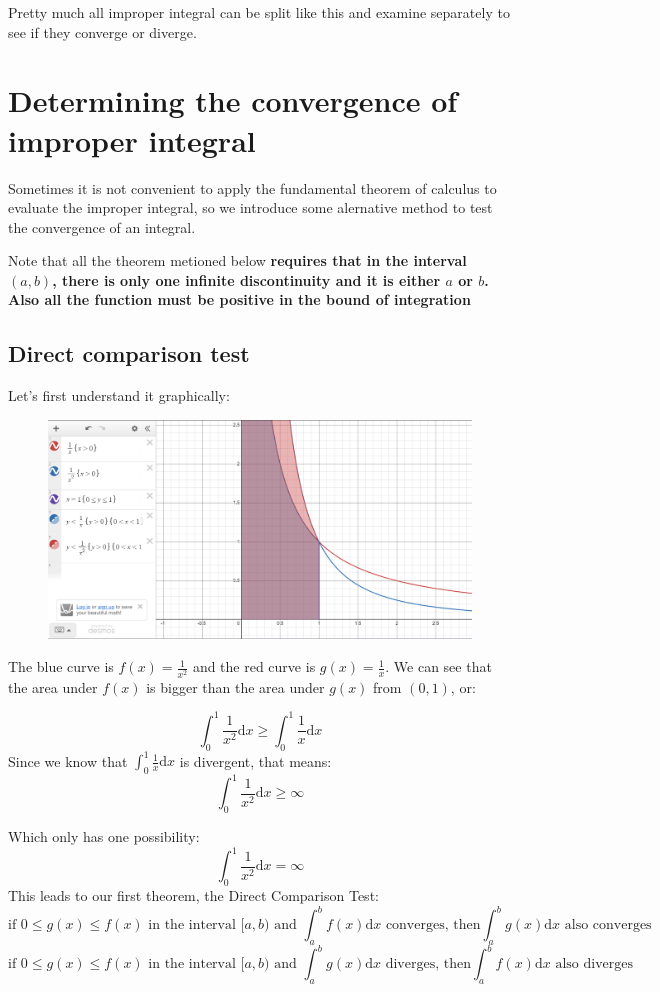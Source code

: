 \documentclass{article}
\begin{document}
Pretty much all improper integral can be split like this and examine separately to see if they converge or diverge.

\newpage
\section{Determining the convergence of improper integral}
Sometimes it is not convenient to apply the fundamental theorem of calculus to evaluate the improper integral, so we introduce some alernative method to test the convergence of an integral.

Note that all the theorem metioned below \textbf{requires that in the interval $(a,b)$, there is only one infinite discontinuity and it is either $a$ or $b$. Also all the function must be positive in the bound of integration}
\subsection{Direct comparison test}
Let's first understand it graphically:
\begin{figure}[H]
    \includegraphics[width = 12cm]{pictures/improperintegral2}
    \centering
\end{figure}
The blue curve is $f(x) = \frac{1}{x^2}$ and the red curve is $g(x) = \frac{1}{x}$. We can see that the area under $f(x)$ is bigger than the area under $g(x)$ from $(0,1)$, or:

\[
    \int_{0}^{1}\frac{1}{x^2}\mathrm{d}x \geq \int_{0}^{1}\frac{1}{x}\mathrm{d}x
\]
Since we know that $\int_{0}^{1}\frac{1}{x}\mathrm{d}x$ is divergent, that means:
\[
    \int_{0}^{1}\frac{1}{x^2}\mathrm{d}x \geq \infty
\]

Which only has one possibility:
\[
    \int_{0}^{1}\frac{1}{x^2}\mathrm{d}x = \infty
\]
This leads to our first theorem, the Direct Comparison Test:
\[
    \text{if } 0 \leq g(x) \leq f(x) \text{ in the interval } [a,b) \text{ and } \int_{a}^{b} f(x) \mathrm{d}x \text{ converges, then} \int_{a}^{b} g(x) \mathrm{d}x \text{ also converges}
\]
\[
    \text{if } 0 \leq g(x) \leq f(x) \text{ in the interval } [a,b) \text{ and } \int_{a}^{b} g(x) \mathrm{d}x \text{ diverges, then} \int_{a}^{b} f(x) \mathrm{d}x \text{ also diverges}
\]
\end{document}
